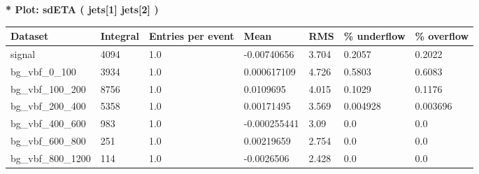 \documentclass[a4paper, 10pt]{article}
\begin{document}
\textbf{* Plot: sdETA ( jets[1] jets[2] ) }\\
   \begin{table}[H]
  \begin{center}
    \begin{tabular}{|m{23.0mm}|m{23.0mm}|m{18.0mm}|m{19.0mm}|m{19.0mm}|m{19.0mm}|m{19.0mm}|}
      \hline
      {\cellcolor{yellow}         Dataset}& {\cellcolor{yellow}         Integral}& {\cellcolor{yellow}         Entries per event}& {\cellcolor{yellow}         Mean}& {\cellcolor{yellow}         RMS}& {\cellcolor{yellow}         \% underflow}& {\cellcolor{yellow}         \% overflow}\\
      \hline
      {\cellcolor{white}         signal}& {\cellcolor{white}         4094}& {\cellcolor{white}         1.0}& {\cellcolor{white}         -0.00740656}& {\cellcolor{white}         3.704}& {\cellcolor{green}         0.2057}& {\cellcolor{green}         0.2022}\\
      \hline
      {\cellcolor{white}         bg\_vbf\_0\_100}& {\cellcolor{white}         3934}& {\cellcolor{white}         1.0}& {\cellcolor{white}         0.000617109}& {\cellcolor{white}         4.726}& {\cellcolor{green}         0.5803}& {\cellcolor{green}         0.6083}\\
      \hline
      {\cellcolor{white}         bg\_vbf\_100\_200}& {\cellcolor{white}         8756}& {\cellcolor{white}         1.0}& {\cellcolor{white}         0.0109695}& {\cellcolor{white}         4.015}& {\cellcolor{green}         0.1029}& {\cellcolor{green}         0.1176}\\
      \hline
      {\cellcolor{white}         bg\_vbf\_200\_400}& {\cellcolor{white}         5358}& {\cellcolor{white}         1.0}& {\cellcolor{white}         0.00171495}& {\cellcolor{white}         3.569}& {\cellcolor{green}         0.004928}& {\cellcolor{green}         0.003696}\\
      \hline
      {\cellcolor{white}         bg\_vbf\_400\_600}& {\cellcolor{white}         983}& {\cellcolor{white}         1.0}& {\cellcolor{white}         -0.000255441}& {\cellcolor{white}         3.09}& {\cellcolor{green}         0.0}& {\cellcolor{green}         0.0}\\
      \hline
      {\cellcolor{white}         bg\_vbf\_600\_800}& {\cellcolor{white}         251}& {\cellcolor{white}         1.0}& {\cellcolor{white}         0.00219659}& {\cellcolor{white}         2.754}& {\cellcolor{green}         0.0}& {\cellcolor{green}         0.0}\\
      \hline
      {\cellcolor{white}         bg\_vbf\_800\_1200}& {\cellcolor{white}         114}& {\cellcolor{white}         1.0}& {\cellcolor{white}         -0.0026506}& {\cellcolor{white}         2.428}& {\cellcolor{green}         0.0}& {\cellcolor{green}         0.0}\\

\end{tabular}
\end{center}
\end{table}
\end{document}
